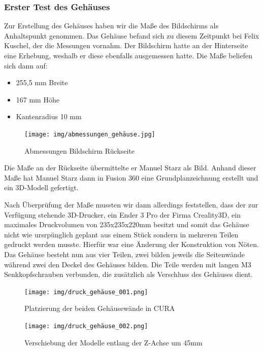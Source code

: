 \subsubsection{Erster Test des Gehäuses}\label{hw_case_ersterTest}
Zur Erstellung des Gehäuses haben wir die Maße des Bildschirms als Anhaltspunkt genommen. 
Das Gehäuse befand sich zu diesem Zeitpunkt bei Felix Kuschel, der die Messungen vornahm. Der Bildschirm hatte an der Hinterseite eine Erhebung, weshalb er diese ebenfalls ausgemessen hatte. 
Die Maße beliefen sich dann auf:
\begin{itemize}
	\item 255,5 mm Breite
	\item 167 mm Höhe
	\item Kantenradius 10 mm
\end{itemize}
	\begin{figure}[h!t]
		\texttt{[image: img/abmessungen\_gehäuse.jpg]}
		\caption[Abmessungen Bildschirm Rückseite]{Abmessungen Bildschirm Rückseite}
		\label{fig:screen-back-01}
	\end{figure}
\noindent Die Maße an der Rückseite übermittelte er Manuel Starz als Bild. Anhand dieser Maße hat Manuel Starz dann in Fusion 360 eine Grundplanzeichnung erstellt und ein 3D-Modell gefertigt.\par	
\noindent Nach Überprüfung der Maße mussten wir dann allerdings feststellen, dass der zur Verfügung stehende 3D-Drucker, ein Ender 3 Pro der Firma Creality3D, ein maximales Druckvolumen von 235x235x220mm besitzt und somit das Gehäuse nicht wie ursrpünglich geplant aus einem Stück sondern in mehreren Teilen gedruckt werden musste. 
Hierfür war eine Änderung der Konstruktion von Nöten. Das Gehäuse besteht nun aus vier Teilen, zwei bilden jeweils die Seitenwände während zwei den Deckel des Gehäuses bilden. Die Teile werden mit langen M3 Senkkopfschrauben verbunden, die zusätzlich als Verschluss des Gehäuses dient.\par
	\begin{figure}[h!]
		\texttt{[image: img/druck\_gehäuse\_001.png]}
		\caption[Platzierung der beiden Gehäusewände in CURA]{Platzierung der beiden Gehäusewände in CURA}
		\label{fig:print-case-test_01}
	\end{figure}
	\begin{figure}[h!]
		\texttt{[image: img/druck\_gehäuse\_002.png]}
		\caption[Verschiebung der Modelle entlang der Z-Achse um 45mm]{Verschiebung der Modelle entlang der Z-Achse um 45mm}
		\label{fig:print-case-test_02}
	\end{figure}
